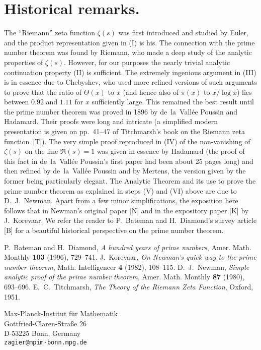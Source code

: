 \documentclass{article}
\begin{document}
\section*{Historical remarks.}
The ``Riemann'' zeta function $\zeta(s)$ was first introduced and studied by Euler, and the product representation given in (I) is his. The connection with the prime number theorem was found by Riemann, who made a deep study of the analytic properties of $\zeta(s)$. However, for our purposes the nearly trivial analytic continuation property (II) is sufficient. The extremely ingenious argument in (III) is in essence due to Chebyshev, who used more refined versions of such arguments to prove that the ratio of $\Theta(x)$ to $x$ (and hence also of $\pi(x)$ to $x/\log x$) lies between $0.92$ and $1.11$ for $x$ sufficiently large. This remained the best result until the prime number theorem was proved in 1896 by de~la~Vall\'ee Poussin and Hadamard. Their proofs were long and intricate (a simplified modern presentation is given on pp.~41--47 of Titchmarsh's book on the Riemann zeta function~[T]). The very simple proof reproduced in (IV) of the non-vanishing of $\zeta(s)$ on the line $\Re(s)=1$ was given in essence by Hadamard (the proof of this fact in de~la~Vall\'ee Poussin's first paper had been about 25 pages long) and then refined by de~la~Vall\'ee Poussin and by Mertens, the version given by the former being particularly elegant. The Analytic Theorem and its use to prove the prime number theorem as explained in steps (V) and (VI) above are due to D.~J.~Newman. Apart from a few minor simplifications, the exposition here follows that in Newman's original paper [N] and in the expository paper [K] by J.~Korevaar. We refer the reader to P.~Bateman and H.~Diamond's survey article [B] for a beautiful historical perspective on the prime number theorem.

\begin{thebibliography}{99}
 P.~Bateman and H.~Diamond, \textit{A hundred years of prime numbers}, Amer. Math. Monthly \textbf{103} (1996), 729--741.
 J.~Korevaar, \textit{On Newman's quick way to the prime number theorem}, Math. Intelligencer \textbf{4} (1982), 108--115.
 D.~J.~Newman, \textit{Simple analytic proof of the prime number theorem}, Amer. Math. Monthly \textbf{87} (1980), 693--696.
 E.~C.~Titchmarsh, \textit{The Theory of the Riemann Zeta Function}, Oxford, 1951.
\end{thebibliography}

\noindent Max-Planck-Institut f\"ur Mathematik\\
Gottfried-Claren-Stra\ss e 26\\
D-53225 Bonn, Germany\\
\texttt{zagier@mpim-bonn.mpg.de}
\end{document}
